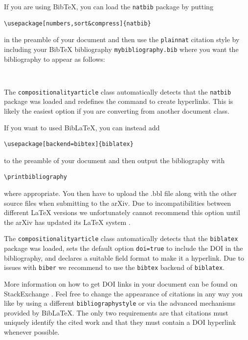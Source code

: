 \documentclass[a4paper,onecolumn,superscriptaddress,10pt,issue=1, volume=2, shorttitle=papers]{compositionalityarticle}
\begin{document}
If you are using BibTeX, you can load the \texttt{natbib} package by putting
\begin{verbatim}
\usepackage[numbers,sort&compress]{natbib}
\end{verbatim}
in the preamble of your document and then use the \texttt{plainnat} citation style by including your BibTeX bibliography \texttt{mybibliography.bib} where you want the bibliography to appear as follows:
\begin{verbatim}


\end{verbatim}
The \texttt{compositionalityarticle} class automatically detects that the \texttt{natbib} package was loaded and redefines the \texttt{\string\doi} command to create hyperlinks.
This is likely the easiest option if you are converting from another document class.

If you want to used BibLaTeX, you can instead add
\begin{verbatim}
\usepackage[backend=bibtex]{biblatex}

\end{verbatim}
to the preamble of your document and then output the bibliography with
\begin{verbatim}
\printbibliography
\end{verbatim}
where appropriate.
You then have to upload the .bbl file along with the other source files when submitting to the arXiv.
Due to incompatibilities between different LaTeX versions we unfortunately cannot recommend this option until the arXiv has updated its LaTeX system \cite{biblatexsubmittingtothearxiv}.

The \texttt{compositionalityarticle} class automatically detects that the \texttt{biblatex} package was loaded, sets the default option \texttt{doi=true} to include the DOI in the bibliography, and declares a suitable field format to make it a hyperlink.
Due to issues with \texttt{biber} we recommend to use the \texttt{bibtex} backend of \texttt{biblatex}.

More information on how to get DOI links in your document can be found on StackExchange \cite{howtogetdoilinksinbibliography,automaticallyaddingdoifieldstoahandmadebibliography}.
Feel free to change the appearance of citations in any way you like by using a different \texttt{bibliographystyle} or via the advanced mechanisms provided by BibLaTeX.
The only two requirements are that citations must uniquely identify the cited work and that they must contain a DOI hyperlink whenever possible.
\end{document}
